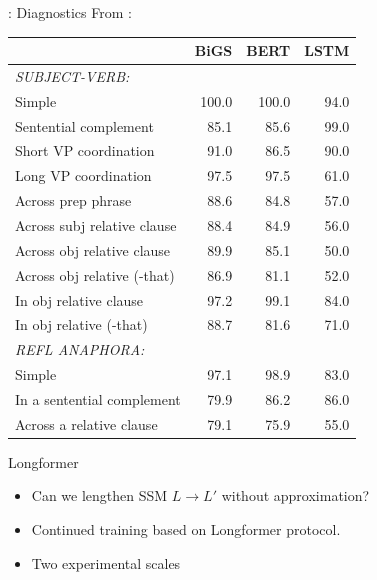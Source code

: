 \documentclass[14pt,aspectratio=169]{beamer}
\begin{document}
\begin{frame}{: Diagnostics }
From \cite{marvin2018targeted,goldberg2019assessing}:
\begin{table}[t]
\centering
\scriptsize
\begin{tabular}{lrrr}
\toprule
& BiGS & BERT & LSTM  \\
\midrule
\textsl{SUBJECT-VERB:}    &       &      &        \\
Simple                              & 100.0 & 100.0& 94.0    \\
Sentential complement          & 85.1  & 85.6 & 99.0   \\
Short VP coordination               & 91.0  & 86.5 & 90.0    \\
Long VP coordination                & 97.5  & 97.5 & 61.0    \\ 
Across prep phrase       & 88.6  & 84.8 & 57.0  \\ 
Across subj relative clause    & 88.4  & 84.9 & 56.0   \\
Across obj relative clause    & 89.9  & 85.1 & 50.0  \\
Across obj relative (-that) & 86.9  & 81.1 & 52.0  \\ 
In  obj relative clause        & 97.2  & 99.1 & 84.0  \\
In obj relative (-that)     & 88.7  & 81.6 & 71.0  \\
\midrule
\textsl{REFL ANAPHORA:}        &       &      &             \\
Simple                              & 97.1  & 98.9 & 83.0    \\
In a sentential complement          & 79.9  & 86.2 & 86.0   \\
Across a relative clause            & 79.1  & 75.9 & 55.0  \\
\bottomrule
\end{tabular}
\end{table}
\end{frame}


\begin{frame}{ Longformer}
\begin{itemize}
    \item Can we lengthen SSM $L\rightarrow L'$ without approximation?
    
    \item Continued training based on Longformer protocol. 
    
    \item Two experimental scales
\end{itemize}
\end{frame}
\end{document}
